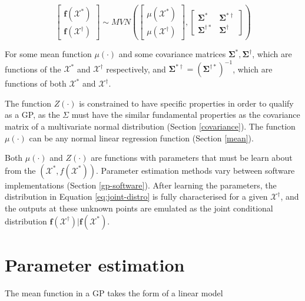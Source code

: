 \documentclass[
  12pt,
  a4paper,
  twoside]{book}
\begin{document}
\begin{equation}
\label{eq:joint-distro}
\begin{bmatrix} \mathbf{f(\mathcal{X}^*)} \\
\mathbf{f(\mathcal{X}^\dagger)}
\end{bmatrix}
\sim MVN\left( \begin{bmatrix} \mu(\mathcal{X^*})\\
\mu(\mathcal{X^\dagger}) \end{bmatrix},
 \begin{bmatrix} \mathbf{\Sigma^*} & \mathbf{\Sigma^{*\dagger}}\\
 \mathbf{\Sigma^{\dagger*}} & \mathbf{\Sigma^{ \dagger}} \end{bmatrix} \right)
\end{equation}

For some mean function \(\mu(\cdot)\) and some covariance matrices \(\mathbf{\Sigma^*}, \mathbf{\Sigma^\dagger}\), which are functions of the \(\mathcal{X^*}\) and \(\mathcal{X^\dagger}\) respectively, and \(\mathbf{\Sigma^{*\dagger}} = (\mathbf{\Sigma^{ \dagger *}})^{-1}\), which are functions of both \(\mathcal{X^*}\) and \(\mathcal{X^\dagger}\).

The function \(Z(\cdot)\) is constrained to have specific properties in order to qualify as a GP, as the \(\Sigma\) must have the similar fundamental properties as the covariance matrix of a multivariate normal distribution (Section \ref{covariance}). The function \(\mu(\cdot)\) can be any normal linear regression function (Section \ref{mean}).

Both \(\mu(\cdot)\) and \(Z(\cdot)\) are functions with parameters that must be learn about from the \((\mathcal{X^*}, f(\mathcal{X^*}))\). Parameter estimation methods vary between software implementations (Section \ref{gp-software}). After learning the parameters, the distribution in Equation \eqref{eq:joint-distro} is fully characterised for a given \(\mathcal{X^\dagger}\), and the outputs at these unknown points are emulated as the joint conditional distribution \(\mathbf{f}(\mathcal{X^\dagger})|\mathbf{f}(\mathcal{X^*})\).

\hypertarget{model-selection}{%
\section{Parameter estimation}\label{model-selection}}

The mean function in a GP takes the form of a linear model
\end{document}
